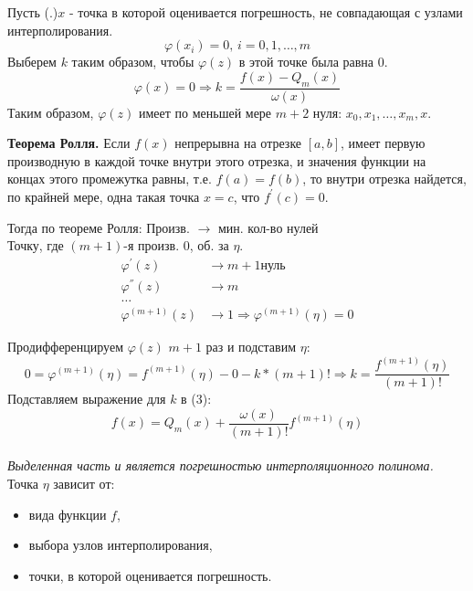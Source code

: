 \documentclass[a4paper,11pt]{article}
\begin{document}
Пусть (.)$x$ - точка в которой оценивается погрешность, не совпадающая с узлами интерполирования.
\[\varphi(x_i) = 0, \, i = 0, 1, \dots, m\]
Выберем $k$ таким образом, чтобы $\varphi(z)$ в этой точке была равна $0$.
\begin{equation}
  \varphi(x) = 0 \Rightarrow k = \frac{f(x) - Q_m(x)}{\omega(x)}
\end{equation}
Таким образом, $\varphi(z)$ имеет по меньшей мере $m+2$ нуля: $x_0, x_1, \dots, x_m, x$. \\
\begin{importantblock}
  \textbf{Теорема Ролля.}
  Если $f(x)$ непрерывна на отрезке $[a,b]$, имеет первую производную в каждой точке внутри этого отрезка, и значения функции на концах этого промежутка равны, т.е. $f(a)=f(b)$, то внутри отрезка найдется, по крайней мере, одна такая точка $x=c$, что $f^{'}(c)=0$.
\end{importantblock}
Тогда по теореме Ролля:
\marginpar
{
  \footnotesize Произв. $\rightarrow$ мин. кол-во нулей \\

  \footnotesize Точку, где $(m+1)$-я произв. 0, об. за $\eta$.
}
\begin{align*}
  \varphi^{'}(z) & \rightarrow m + 1 \text{нуль} \\
  \varphi^{''}(z) & \rightarrow m \\
  \dots \\
  \varphi^{(m + 1)}(z) & \rightarrow 1 \Rightarrow \varphi^{(m + 1)}(\eta) = 0
\end{align*}

Продифференцируем $\varphi(z)$ $m+1$ раз и подставим $\eta$:
\[0 = \varphi^{(m+1)}(\eta) = f^{(m+1)}(\eta) - 0 - k * (m + 1)! \Rightarrow k = \frac{f^{(m+1)}(\eta)}{(m+1)!}\]
Подставляем выражение для $k$ в (3):
\[f(x) = Q_m(x) + \boxed{\frac{\omega(x)}{(m+1)!}f^{(m+1)}(\eta)}\] \\
\textit{Выделенная часть и является погрешностью интерполяционного полинома.}
Точка $\eta$ зависит от:
\begin{itemize}
  \item вида функции $f$,
  \item выбора узлов интерполирования,
  \item точки, в которой оценивается погрешность.
\end{itemize}
\end{document}
